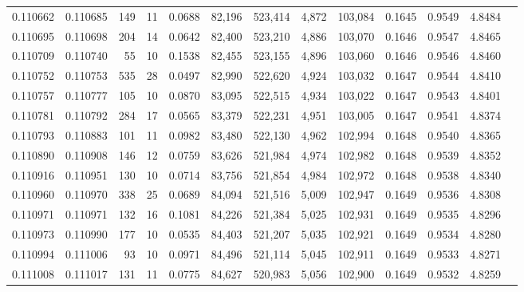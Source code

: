 \begin{tabular}{rrrrrrrrrrrrr}
0.110662 & 0.110685 &   149 &  11 &                                     0.0688 &  82,196 & 523,414 &   4,872 & 103,084 & 0.1645 & 0.9549 & 4.8484 \\
0.110695 & 0.110698 &   204 &  14 &                                     0.0642 &  82,400 & 523,210 &   4,886 & 103,070 & 0.1646 & 0.9547 & 4.8465 \\
0.110709 & 0.110740 &    55 &  10 &                                     0.1538 &  82,455 & 523,155 &   4,896 & 103,060 & 0.1646 & 0.9546 & 4.8460 \\
0.110752 & 0.110753 &   535 &  28 &                                     0.0497 &  82,990 & 522,620 &   4,924 & 103,032 & 0.1647 & 0.9544 & 4.8410 \\
0.110757 & 0.110777 &   105 &  10 &                                     0.0870 &  83,095 & 522,515 &   4,934 & 103,022 & 0.1647 & 0.9543 & 4.8401 \\
0.110781 & 0.110792 &   284 &  17 &                                     0.0565 &  83,379 & 522,231 &   4,951 & 103,005 & 0.1647 & 0.9541 & 4.8374 \\
0.110793 & 0.110883 &   101 &  11 &                                     0.0982 &  83,480 & 522,130 &   4,962 & 102,994 & 0.1648 & 0.9540 & 4.8365 \\
0.110890 & 0.110908 &   146 &  12 &                                     0.0759 &  83,626 & 521,984 &   4,974 & 102,982 & 0.1648 & 0.9539 & 4.8352 \\
0.110916 & 0.110951 &   130 &  10 &                                     0.0714 &  83,756 & 521,854 &   4,984 & 102,972 & 0.1648 & 0.9538 & 4.8340 \\
0.110960 & 0.110970 &   338 &  25 &                                     0.0689 &  84,094 & 521,516 &   5,009 & 102,947 & 0.1649 & 0.9536 & 4.8308 \\
0.110971 & 0.110971 &   132 &  16 &                                     0.1081 &  84,226 & 521,384 &   5,025 & 102,931 & 0.1649 & 0.9535 & 4.8296 \\
0.110973 & 0.110990 &   177 &  10 &                                     0.0535 &  84,403 & 521,207 &   5,035 & 102,921 & 0.1649 & 0.9534 & 4.8280 \\
0.110994 & 0.111006 &    93 &  10 &                                     0.0971 &  84,496 & 521,114 &   5,045 & 102,911 & 0.1649 & 0.9533 & 4.8271 \\
0.111008 & 0.111017 &   131 &  11 &                                     0.0775 &  84,627 & 520,983 &   5,056 & 102,900 & 0.1649 & 0.9532 & 4.8259 \\

\end{tabular}
